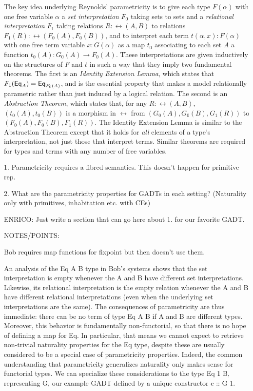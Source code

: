 \documentclass[acmsmall,screen,review,anonymous]{acmart}
\theoremstyle{definition}
\begin{document}
The key idea underlying Reynolds' parametricity is to give each type
$F(\alpha)$ with one free variable $\alpha$ a {\em set interpretation}
$F_0$ taking sets to sets and a \emph{relational interpretation} $F_1$
taking relations $R : \rel(A,B)$ to relations $F_1 (R) : \rel(F_0 (A),
F_0 (B))$, and to interpret each term $t(\alpha,x) : F(\alpha)$ with
one free term variable $x : G(\alpha)$ as a map $t_0$ associating to
each set $A$ a function $t_0(A) : G_0(A) \to F_0(A)$. These
interpretations are given inductively on the structures of $F$ and $t$
in such a way that they imply two fundamental theorems. The first is
an \emph{Identity Extension Lemma}, which states that $F_1(\mathsf{Eq}_A) =
\mathsf{Eq}_{F_0(A)}$, and is the essential property that makes a model
relationally parametric rather than just induced by a logical
relation. The second is an \emph{Abstraction Theorem}, which states
that, for any $R :\rel(A, B)$, $(t_0(A),t_0(B))$ is a morphism in
$\rel$ from $(G_0(A),G_0(B),G_1(R))$ to $(F_0(A),F_0(B),F_1(R))$. The
Identity Extension Lemma is similar to the Abstraction Theorem except
that it holds for {\em all} elements of a type's interpretation, not
just those that interpret terms.  Similar theorems are required for
types and terms with any number of free variables.

1. Parametricity requires a fibred semantics. This doesn't happen for
primitive rep.

2. What are the parametricity properties for GADTs in each setting?
(Naturality only with primitives, inhabitation etc. with CEs)

{\color{red} ENRICO: Just write a section that can go here about
  1. for our favorite GADT.}

\vspace*{1in}


NOTES/POINTS:

Bob requires map functions for fixpoint but then doesn't use them.

An analysis of the Eq A B type in Bob's systems shows that the set
interpretation is empty whenever the A and B have different set
interpretations.  Likewise, its relational interpretation is the empty
relation whenever the A and B have different relational
interpretations (even when the underlying set interpretations are the
same).  The consequences of parametricity are thus immediate: there
can be no term of type Eq A B if A and B are different types.
Moreover, this behavior is fundamentally non-functorial, so that there
is no hope of defining a map for Eq.  In particular, that means we
cannot expect to retrieve non-trivial naturality properties for the Eq
type, despite these are usually considered to be a special case of
parametricity properties.  Indeed, the common understanding that
parametricity generalizes naturality only makes sense for functorial
types.  We can specialize these considerations to the type Eq 1 B,
representing G, our example GADT defined by a unique constructor c ::
G 1.
\end{document}
